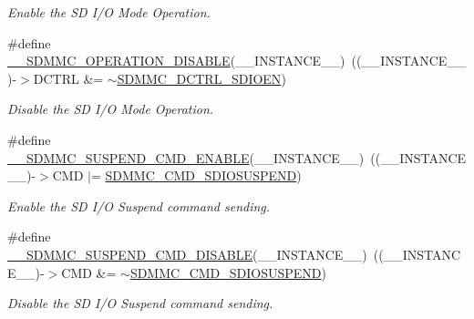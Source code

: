 \begin{DoxyCompactItemize}
\begin{DoxyCompactList}\small\item\em Enable the SD I/O Mode Operation. \end{DoxyCompactList}\item 
\#define \mbox{\hyperlink{group___s_d_m_m_c___l_l___interrupt___clock_gab72fdd2401a780492474349fd45592d1}{\+\_\+\+\_\+\+S\+D\+M\+M\+C\+\_\+\+O\+P\+E\+R\+A\+T\+I\+O\+N\+\_\+\+D\+I\+S\+A\+B\+LE}}(\+\_\+\+\_\+\+I\+N\+S\+T\+A\+N\+C\+E\+\_\+\+\_\+)~((\+\_\+\+\_\+\+I\+N\+S\+T\+A\+N\+C\+E\+\_\+\+\_\+)-\/$>$D\+C\+T\+RL \&= $\sim$\mbox{\hyperlink{group___peripheral___registers___bits___definition_gab66312264da16d4693a3c9a9cba33c9e}{S\+D\+M\+M\+C\+\_\+\+D\+C\+T\+R\+L\+\_\+\+S\+D\+I\+O\+EN}})
\begin{DoxyCompactList}\small\item\em Disable the SD I/O Mode Operation. \end{DoxyCompactList}\item 
\#define \mbox{\hyperlink{group___s_d_m_m_c___l_l___interrupt___clock_ga58bc9956e8a4edaffd8828923ded632a}{\+\_\+\+\_\+\+S\+D\+M\+M\+C\+\_\+\+S\+U\+S\+P\+E\+N\+D\+\_\+\+C\+M\+D\+\_\+\+E\+N\+A\+B\+LE}}(\+\_\+\+\_\+\+I\+N\+S\+T\+A\+N\+C\+E\+\_\+\+\_\+)~((\+\_\+\+\_\+\+I\+N\+S\+T\+A\+N\+C\+E\+\_\+\+\_\+)-\/$>$C\+MD $\vert$= \mbox{\hyperlink{group___peripheral___registers___bits___definition_gaebb2a41639369a8c17cdb7b900b645a9}{S\+D\+M\+M\+C\+\_\+\+C\+M\+D\+\_\+\+S\+D\+I\+O\+S\+U\+S\+P\+E\+ND}})
\begin{DoxyCompactList}\small\item\em Enable the SD I/O Suspend command sending. \end{DoxyCompactList}\item 
\#define \mbox{\hyperlink{group___s_d_m_m_c___l_l___interrupt___clock_ga5086b97bef527e383097b4843d49769a}{\+\_\+\+\_\+\+S\+D\+M\+M\+C\+\_\+\+S\+U\+S\+P\+E\+N\+D\+\_\+\+C\+M\+D\+\_\+\+D\+I\+S\+A\+B\+LE}}(\+\_\+\+\_\+\+I\+N\+S\+T\+A\+N\+C\+E\+\_\+\+\_\+)~((\+\_\+\+\_\+\+I\+N\+S\+T\+A\+N\+C\+E\+\_\+\+\_\+)-\/$>$C\+MD \&= $\sim$\mbox{\hyperlink{group___peripheral___registers___bits___definition_gaebb2a41639369a8c17cdb7b900b645a9}{S\+D\+M\+M\+C\+\_\+\+C\+M\+D\+\_\+\+S\+D\+I\+O\+S\+U\+S\+P\+E\+ND}})
\begin{DoxyCompactList}\small\item\em Disable the SD I/O Suspend command sending. \end{DoxyCompactList}\end{DoxyCompactItemize}


